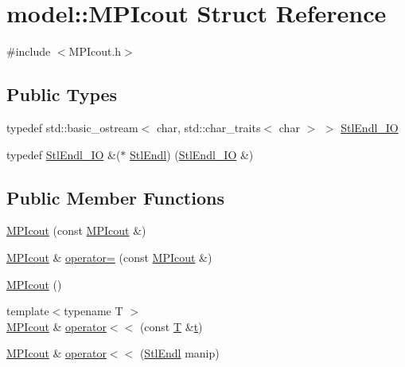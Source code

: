\hypertarget{structmodel_1_1_m_p_icout}{}\section{model\+:\+:M\+P\+Icout Struct Reference}
\label{structmodel_1_1_m_p_icout}


{\ttfamily \#include $<$M\+P\+Icout.\+h$>$}

\subsection*{Public Types}
\begin{DoxyCompactItemize}
\item 
typedef std\+::basic\+\_\+ostream$<$ char, std\+::char\+\_\+traits$<$ char $>$ $>$ \hyperlink{structmodel_1_1_m_p_icout_a423b0351fcdc912e2179e2431717f82f}{Stl\+Endl\+\_\+\+I\+O}
\item 
typedef \hyperlink{structmodel_1_1_m_p_icout_a423b0351fcdc912e2179e2431717f82f}{Stl\+Endl\+\_\+\+I\+O} \&($\ast$ \hyperlink{structmodel_1_1_m_p_icout_a8e2a24cb7708fe390e6c7599b6e3fc0c}{Stl\+Endl}) (\hyperlink{structmodel_1_1_m_p_icout_a423b0351fcdc912e2179e2431717f82f}{Stl\+Endl\+\_\+\+I\+O} \&)
\end{DoxyCompactItemize}
\subsection*{Public Member Functions}
\begin{DoxyCompactItemize}
\item 
\hyperlink{structmodel_1_1_m_p_icout_a3b161cfe9fef8c019aac22226e4fad9f}{M\+P\+Icout} (const \hyperlink{structmodel_1_1_m_p_icout}{M\+P\+Icout} \&)
\item 
\hyperlink{structmodel_1_1_m_p_icout}{M\+P\+Icout} \& \hyperlink{structmodel_1_1_m_p_icout_ad71654e769d7cdb00e75dc8145dc8cab}{operator=} (const \hyperlink{structmodel_1_1_m_p_icout}{M\+P\+Icout} \&)
\item 
\hyperlink{structmodel_1_1_m_p_icout_a0a4e33196863894682aea2ec359f5f07}{M\+P\+Icout} ()
\item 
{\footnotesize template$<$typename T $>$ }\\\hyperlink{structmodel_1_1_m_p_icout}{M\+P\+Icout} \& \hyperlink{structmodel_1_1_m_p_icout_a04b9ba1f0936b977ee5308ff5fadbff0}{operator$<$$<$} (const \hyperlink{_spline_node_base__corder1_8h_a82692d3a5502b91460591f1d5504314a}{T} \&\hyperlink{_cubic_spline_intersection_8m_a83f7cd78c84d2604d0862bd818b9ac29}{t})
\item 
\hyperlink{structmodel_1_1_m_p_icout}{M\+P\+Icout} \& \hyperlink{structmodel_1_1_m_p_icout_aa585409b5da177baf4c8c59e833db046}{operator$<$$<$} (\hyperlink{structmodel_1_1_m_p_icout_a8e2a24cb7708fe390e6c7599b6e3fc0c}{Stl\+Endl} manip)
\end{DoxyCompactItemize}
